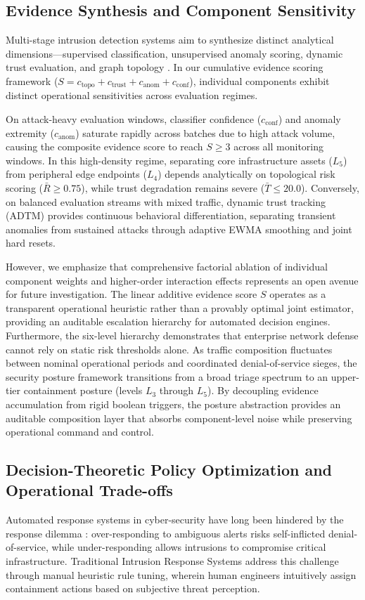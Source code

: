 \documentclass[journal,10pt,onecolumn]{IEEEtran}
\begin{document}
\subsection{Evidence Synthesis and Component Sensitivity}
Multi-stage intrusion detection systems aim to synthesize distinct analytical dimensions—supervised classification, unsupervised anomaly scoring, dynamic trust evaluation, and graph topology \cite{20, 30}. In our cumulative evidence scoring framework ($S = c_{\text{topo}} + c_{\text{trust}} + c_{\text{anom}} + c_{\text{conf}}$), individual components exhibit distinct operational sensitivities across evaluation regimes.

On attack-heavy evaluation windows, classifier confidence ($c_{\text{conf}}$) and anomaly extremity ($c_{\text{anom}}$) saturate rapidly across batches due to high attack volume, causing the composite evidence score to reach $S \ge 3$ across all monitoring windows. In this high-density regime, separating core infrastructure assets ($L_5$) from peripheral edge endpoints ($L_4$) depends analytically on topological risk scoring ($\bar{R} \ge 0.75$), while trust degradation remains severe ($\bar{T} \le 20.0$). Conversely, on balanced evaluation streams with mixed traffic, dynamic trust tracking (ADTM) provides continuous behavioral differentiation, separating transient anomalies from sustained attacks through adaptive EWMA smoothing and joint hard resets.

However, we emphasize that comprehensive factorial ablation of individual component weights and higher-order interaction effects represents an open avenue for future investigation. The linear additive evidence score $S$ operates as a transparent operational heuristic rather than a provably optimal joint estimator, providing an auditable escalation hierarchy for automated decision engines. Furthermore, the six-level hierarchy demonstrates that enterprise network defense cannot rely on static risk thresholds alone. As traffic composition fluctuates between nominal operational periods and coordinated denial-of-service sieges, the security posture framework transitions from a broad triage spectrum to an upper-tier containment posture (levels $L_3$ through $L_5$). By decoupling evidence accumulation from rigid boolean triggers, the posture abstraction provides an auditable composition layer that absorbs component-level noise while preserving operational command and control.


\subsection{Decision-Theoretic Policy Optimization and Operational Trade-offs}
Automated response systems in cyber-security have long been hindered by the response dilemma \cite{26, 27}: over-responding to ambiguous alerts risks self-inflicted denial-of-service, while under-responding allows intrusions to compromise critical infrastructure. Traditional Intrusion Response Systems address this challenge through manual heuristic rule tuning, wherein human engineers intuitively assign containment actions based on subjective threat perception.
\end{document}

